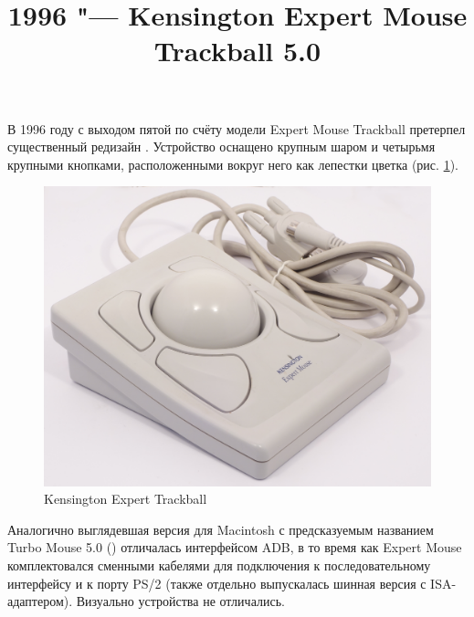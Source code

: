 \documentclass[11pt, a4paper]{article}
\begin{document}
\title{1996 "--- Kensington Expert Mouse Trackball 5.0}
\date{}
\maketitle
В 1996 году с выходом пятой по счёту модели Expert Mouse Trackball претерпел существенный редизайн \cite{KensingtonPC}. Устройство оснащено крупным шаром и четырьмя крупными кнопками, расположенными вокруг него как лепестки цветка (рис. \ref{fig:pic}).

\begin{figure}[h]
    \centering
    \includegraphics[scale=0.4]{1996_kensington_expert_trackball_5/king.jpg}
    \caption{Kensington Expert Trackball}
    \label{fig:pic}
\end{figure}

Аналогично выглядевшая версия для Macintosh с предсказуемым названием Turbo Mouse 5.0 (\cite{KensingtonMac}) отличалась интерфейсом ADB, в то время как Expert Mouse комплектовался сменными кабелями для подключения к последовательному интерфейсу и к порту PS/2 (также отдельно выпускалась шинная версия с ISA-адаптером). Визуально устройства не отличались.
\end{document}
